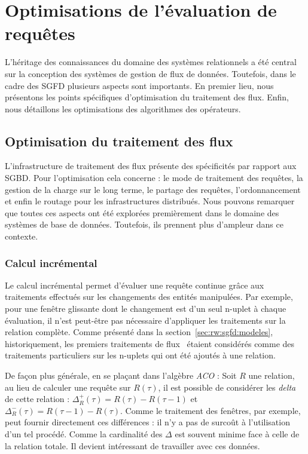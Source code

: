 \section{Optimisations de l'évaluation de requêtes}\label{sec:rw:sgfd:optim}
L'héritage des connaissances du domaine des systèmes relationnels a été central sur la conception des systèmes de gestion de flux de données. Toutefois, dans le cadre des SGFD plusieurs aspects sont importants. En premier lieu, nous présentons les points spécifiques d'optimisation du traitement des flux. Enfin, nous détaillons les optimisations des algorithmes des opérateurs.

\subsection{Optimisation du traitement des flux}\label{sec:rw:sgfd:optimisation:flux}
L'infrastructure de traitement des flux présente des spécificités par rapport aux SGBD. Pour l'optimisation cela concerne : le mode de traitement des requêtes, la gestion de la charge sur le long terme, le partage des requêtes, l'ordonnancement et enfin le routage pour les infrastructures distribués. Nous pouvons remarquer que toutes ces aspects ont été explorées premièrement dans le domaine des systèmes de base de données. Toutefois, ils prennent plus d'ampleur dans ce contexte.

\subsubsection{Calcul incrémental}
Le calcul incrémental permet d'évaluer une requête continue grâce aux traitements effectués sur les changements des entités manipulées. Par exemple, pour une fenêtre glissante dont le changement est d'un seul n-uplet à chaque évaluation, il n'est peut-être pas nécessaire d'appliquer les traitements sur la relation complète. Comme présenté dans la section~\ref{sec:rw:sgfd:modeles}, historiquement, les premiers traitements de flux~\cite{Terry:tapestry} étaient considérés comme des traitements particuliers sur les n-uplets qui ont été ajoutés à une relation.

De façon plus générale, en se plaçant dans l'algèbre \textit{ACO} : Soit $R$ une relation, au lieu de calculer une requête sur $R(\tau)$, il est possible de considérer les \textit{delta} de cette relation : $\Delta_R^+(\tau) = R(\tau)-R(\tau-1)$ et $\Delta_R^-(\tau) = R(\tau-1)-R(\tau)$. Comme le traitement des fenêtres, par exemple, peut fournir directement ces différences : il n'y a pas de surcoût à l'utilisation d'un tel procédé. Comme la cardinalité des $\Delta$ est souvent minime face à celle de la relation totale. Il devient intéressant de travailler avec ces données.

